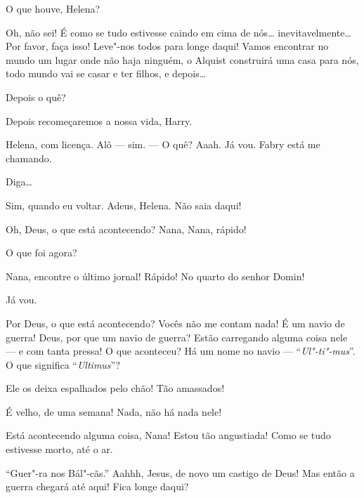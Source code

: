   O que houve, Helena?

 Oh, não sei! É como se tudo estivesse caindo em cima de nós\ldots{}
inevitavelmente\ldots{} Por favor, faça isso! Leve"-nos todos para longe daqui! Vamos
encontrar no mundo um lugar onde não haja ninguém, o Alquist construirá uma casa
para nós, todo mundo vai se casar e ter filhos, e depois\ldots{}

 Depois o quê?

 Depois recomeçaremos a nossa vida, Harry.

  Helena, com licença.  Alô
--- sim. --- O quê? Aaah. Já vou.  Fabry está me chamando.

  Diga\ldots{}

 Sim, quando eu voltar. Adeus, Helena.  Não saia daqui!

  Oh, Deus, o que está acontecendo? Nana, Nana, rápido!

  O que foi agora?

 Nana, encontre o último jornal! Rápido! No quarto do senhor Domin!

 Já vou. 

 Por Deus, o que está acontecendo? Vocês não me contam nada!  É um navio de guerra! Deus, por que um navio de
guerra? Estão carregando alguma coisa nele --- e com tanta pressa! O que
aconteceu? Há um nome no navio --- ``\textit{Ul"-ti"-mus}''. O que significa
``\textit{Ultimus}''?

  Ele os deixa espalhados pelo chão! Tão
amassados!

  É velho, de uma semana! Nada, não há
nada nele! 

 Está acontecendo alguma coisa, Nana! Estou tão angustiada! Como se tudo
estivesse morto, até o ar.

  ``Guer"-ra nos Bál"-cãs.'' Aahhh, Jesus, de novo um castigo
de Deus! Mas então a guerra chegará até aqui! Fica longe daqui?


